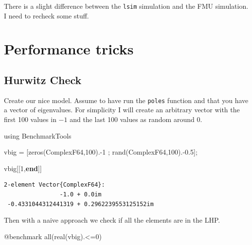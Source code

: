\documentclass[
  a4paper,
  DIV=11,
  numbers=noendperiod]{scrreprt}
\newenvironment{Shaded}{\begin{snugshade}}{\end{snugshade}}
\newcommand{\BuiltInTok}[1]{\textcolor[rgb]{0.00,0.23,0.31}{#1}}
\newcommand{\DataTypeTok}[1]{\textcolor[rgb]{0.68,0.00,0.00}{#1}}
\newcommand{\FloatTok}[1]{\textcolor[rgb]{0.68,0.00,0.00}{#1}}
\newcommand{\FunctionTok}[1]{\textcolor[rgb]{0.28,0.35,0.67}{#1}}
\newcommand{\ImportTok}[1]{\textcolor[rgb]{0.00,0.46,0.62}{#1}}
\newcommand{\KeywordTok}[1]{\textcolor[rgb]{0.00,0.23,0.31}{\textbf{#1}}}
\newcommand{\NormalTok}[1]{\textcolor[rgb]{0.00,0.23,0.31}{#1}}
\newcommand{\OperatorTok}[1]{\textcolor[rgb]{0.37,0.37,0.37}{#1}}
\newcommand{\PreprocessorTok}[1]{\textcolor[rgb]{0.68,0.00,0.00}{#1}}
\begin{document}
There is a slight difference between the \texttt{lsim} simulation and
the FMU simulation. I need to recheck some stuff.



\cleardoublepage
{}
{}
\appendix

\chapter{Performance tricks}\label{performance-tricks}

\section{Hurwitz Check}\label{hurwitz-check}

Create our nice model. Assume to have run the \texttt{poles} function
and that you have a vector of eigenvalues. For simplicity I will create
an arbitrary vector with the first 100 values in \(-1\) and the last 100
values as random around \(0\).

\begin{Shaded}
\begin{Highlighting}[]
\ImportTok{using} \BuiltInTok{BenchmarkTools}

\NormalTok{vbig }\OperatorTok{=}\NormalTok{ [}\FunctionTok{zeros}\NormalTok{(}\DataTypeTok{ComplexF64}\NormalTok{,}\FloatTok{100}\NormalTok{)}\OperatorTok{.{-}}\FloatTok{1}\NormalTok{ ; }\FunctionTok{rand}\NormalTok{(}\DataTypeTok{ComplexF64}\NormalTok{,}\FloatTok{100}\NormalTok{)}\OperatorTok{.{-}}\FloatTok{0.5}\NormalTok{];}

\NormalTok{vbig[[}\FloatTok{1}\NormalTok{,}\KeywordTok{end}\NormalTok{]]}
\end{Highlighting}
\end{Shaded}

\begin{verbatim}
2-element Vector{ComplexF64}:
                -1.0 + 0.0im
 -0.4331044312441319 + 0.2962239553125152im
\end{verbatim}

Then with a naive approach we check if all the elements are in the LHP.

\begin{Shaded}
\begin{Highlighting}[]
\PreprocessorTok{@benchmark} \FunctionTok{all}\NormalTok{(}\FunctionTok{real}\NormalTok{(vbig)}\OperatorTok{.\textless{}=}\FloatTok{0}\NormalTok{)}
\end{Highlighting}
\end{Shaded}
\end{document}

